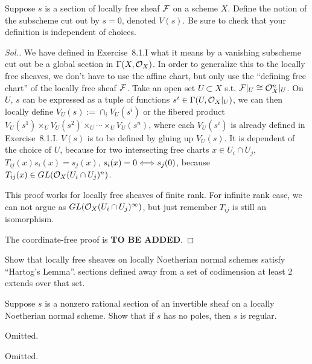 \documentclass[11pt]{book} %
\begin{document}
\begin{exr}
Suppose $s$ is a section of locally free sheaf ${\cal F}$ on a scheme $X$. Define the notion of the subscheme cut out by $s=0$, denoted $V(s)$. Be sure to check that your definition is independent of choices.
\end{exr}
\begin{proof}[Sol.]
We have defined in Exercise~8.1.I what it means by a vanishing subscheme cut out be a global section in $\Gamma(X,{\cal O}_X)$. In order to generalize this to the locally free sheaves, we don't have to use the affine chart, but only use the ``defining free chart'' of the locally free sheaf ${\cal F}$. Take an open set  $U\subset X$ s.t. ${\cal F}|_U\cong {\cal O}_X^n|_U$. On $U$, $s$ can be expressed as a tuple of functions $s^i\in \Gamma(U,{\cal O}_X|_U)$, we can then locally define $V_U(s):=\cap_i V_U(s^i) $ or the fibered product $V_U(s^1)\times_{U} V_U(s^2)\times_{U}\cdots\times_U V_U(s^n)$, where each $V_U(s^i)$ is already defined in Exercise~8.1.I. $V(s)$ is to be defined by gluing up $V_U(s)$. It is dependent of the choice of $U$, because for two intersecting free charts $x\in U_i\cap U_j$, $T_{ij}(x)s_i(x)=s_j(x)$, $s_i(x)=0\Longleftrightarrow s_j(0)$, because $T_{ij}(x)\in GL({\cal O}_{X}(U_i\cap U_j)^n)$.

This proof works for locally free sheaves of finite rank. For infinite rank case, we can not argue as $GL({\cal O}_{X}(U_i\cap U_j)^\infty)$, but just remember $T_{ij}$ is still an isomorphism.

The coordinate-free proof is \textbf{TO BE ADDED}.
\end{proof}
\begin{exr}
Show that locally free sheaves on locally Noetherian normal schemes satisfy ``Hartog's Lemma''. sections defined away from a set of codimension at least 2 extends over that set. 
\end{exr}

\begin{exr}
Suppose $s$ is a nonzero rational section of an invertible sheaf on a locally Noetherian normal scheme. Show that if $s$ has no poles, then $s$ is regular.
\end{exr}
\begin{exr}
Omitted.
\end{exr}
\begin{exr}
Omitted.
\end{exr}
\end{document}
